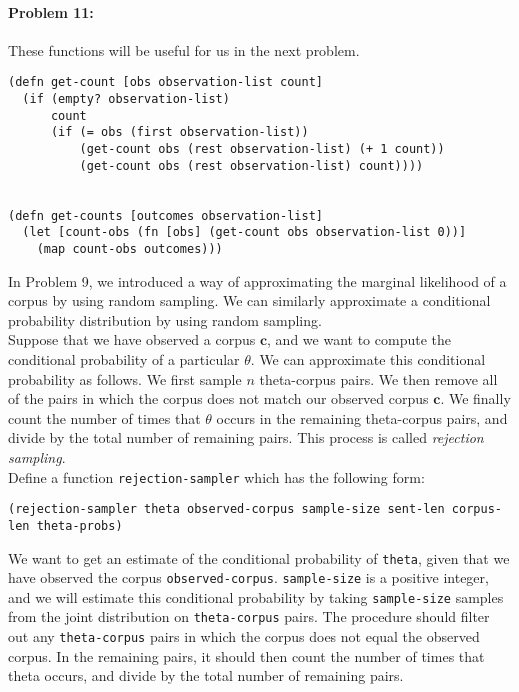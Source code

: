 \documentclass[10pt]{article}
\begin{document}
\hrulefill
\paragraph{Problem 11:}
These functions will be useful for us in the next problem.

\begin{lstlisting}
(defn get-count [obs observation-list count]
  (if (empty? observation-list)
      count
      (if (= obs (first observation-list))
          (get-count obs (rest observation-list) (+ 1 count))
          (get-count obs (rest observation-list) count))))


(defn get-counts [outcomes observation-list]
  (let [count-obs (fn [obs] (get-count obs observation-list 0))]
    (map count-obs outcomes)))
\end{lstlisting}

\noindent In Problem 9, we introduced a way of approximating the marginal
likelihood of a corpus by using random sampling. We can similarly
approximate a conditional probability distribution by using random
sampling.
\\

\noindent Suppose that we have observed a corpus $\mathbf{c}$, and we
want to compute the conditional probability of a particular
$\theta$. We can approximate this conditional probability as
follows. We first sample $n$ theta-corpus pairs. We then remove all of
the pairs in which the corpus does not match our observed corpus
$\mathbf{c}$. We finally count the number of times that $\theta$
occurs in the remaining theta-corpus pairs, and divide by the total
number of remaining pairs. This process is called \textit{rejection
  sampling}.
\\

\noindent 
Define a function \texttt{rejection-sampler} which has the following
form:
 
\begin{lstlisting}
(rejection-sampler theta observed-corpus sample-size sent-len corpus-len theta-probs)
\end{lstlisting}

\noindent We want to get an estimate of the conditional probability of
\texttt{theta}, given that we have observed the corpus
\texttt{observed-corpus}. \texttt{sample-size} is a positive integer,
and we will estimate this conditional probability by taking
\texttt{sample-size} samples from the joint distribution on
\texttt{theta-corpus} pairs. The procedure should filter out any
\texttt{theta-corpus} pairs in which the corpus does not equal the
observed corpus. In the remaining pairs, it should then count the
number of times that theta occurs, and divide by the total number of
remaining pairs.
\end{document}
